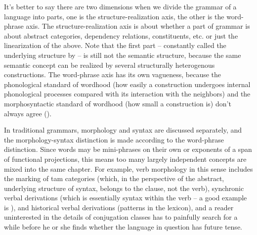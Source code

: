 \documentclass[UTF8, a4paper, oneside, scheme=plain]{ctexrep}
\begin{document}
It's better to say there are two dimensions 
when we divide the grammar of a language into parts,
one is the structure-realization axis,
the other is the word-phrase axis.
The structure-realization axis is about 
whether a part of grammar is about abstract categories, dependency relations, constituents, etc. 
or just the linearization of the above.
Note that the first part -- constantly called the underlying structure by \citet{dixon2009basic1} 
-- is still not the semantic structure,
because the same semantic concept can be realized by several structurally heterogenous constructions.
The word-phrase axis has its own vagueness,
because the phonological standard of wordhood 
(how easily a construction undergoes internal phonological processes 
compared with its interaction with the neighbors)
and the morphosyntactic standard of wordhood 
(how small a construction is)
don't always agree ().

In traditional grammars,
morphology and syntax are discussed separately,
and the morphology-syntax distinction is made according to the word-phrase distinction.
Since words may be mini-phrases on their own or exponents of a span of functional projections,
this means too many largely independent concepts are mixed into the same chapter.
For example, verb morphology in this sense includes 
the marking of \acs{tam} categories 
(which, in the perspective of the abstract, underlying structure of syntax, 
belongs to the clause, not the verb),
synchronic verbal derivations 
(which is essentially syntax within the verb -- a good example is \citet{de2019negation}),
and historical verbal derivations 
(patterns in the lexicon),
and a reader uninterested in the details of conjugation classes 
has to painfully search for a while before he or she finds 
whether the language in question has future tense.
\end{document}
